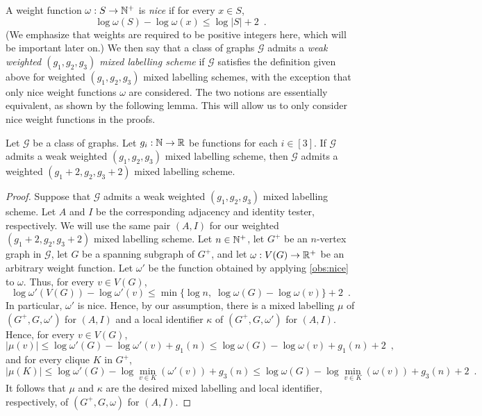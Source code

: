 \documentclass{patmorin}
\renewcommand{\le}{\leqslant}
\renewcommand{\leq}{\leqslant}
\newcommand{\david}[1]{\noindent{\color{orange} DW: #1}}
\newcommand{\vida}[1]{\noindent{\color{pink} VD: #1}}
\newcommand{\defin}[1]{\emph{\textcolor{brightmaroon}{#1}}}
\begin{document}
A weight function $\omega:S\to \mathbb{N}^+$ is \defin{nice} if
for every $x\in S$,
\[
  \log \omega(S) - \log \omega(x) \leq \log |S| + 2\enspace.
\]
(We emphasize that weights are required to be positive integers here, which will be important later on.)
We then say that a class of graphs $\mathcal{G}$ admits a \defin{weak weighted $(g_1,g_2,g_3)$ mixed labelling scheme} if $\mathcal{G}$ satisfies the definition given above for weighted $(g_1,g_2,g_3)$ mixed labelling schemes, with the exception that only nice weight functions $\omega$ are considered.
The two notions are essentially equivalent, as shown by the following lemma. This will allow us to only consider nice weight functions in the proofs.

\begin{lem}
  \label{lem:nice_weights}
  Let $\mathcal{G}$ be a class of graphs.
  Let $g_i:\mathbb{N}\to\mathbb{R}$ be functions for each $i\in[3]$.
  If $\mathcal{G}$ admits a weak weighted $(g_1,g_2,g_3)$ mixed labelling scheme, then $\mathcal{G}$ admits a weighted $(g_1+2,g_2,g_3+2)$ mixed labelling scheme.
\end{lem}
\begin{proof}
  Suppose that $\mathcal{G}$ admits a weak weighted $(g_1,g_2,g_3)$ mixed labelling scheme.
  Let $A$ and $I$ be the corresponding adjacency and identity tester, respectively.
  We will use the same pair $(A, I)$ for our weighted $(g_1+2,g_2,g_3+2)$ mixed labelling scheme.
  Let $n\in \mathbb{N}^+$, let $G^+$ be an $n$-vertex graph in $\mathcal{G}$, let $G$ be a spanning subgraph of $G^+$, and let $\omega:V(G)\to \mathbb{R}^+$ be an arbitrary weight function.
  Let $\omega'$ be the function obtained by applying \cref{obs:nice} to $\omega$.
  Thus, for every $v\in V(G)$,
  \[
    \log\omega'(V(G))-\log\omega'(v)\le\min\{\log n,\;\log\omega(G)-\log\omega(v)\}+2 \enspace.
  \]
  In particular, $\omega'$ is nice.
  Hence, by our assumption, there is a mixed labelling $\mu$ of $(G^+,G,\omega')$ for $(A,I)$ and a local identifier $\kappa$ of $(G^+,G,\omega')$ for $(A,I)$.
  Hence, for every $v\in V(G)$,
  \[
    |\mu(v)| \leq \log \omega'(G) - \log\omega'(v) + g_1(n) \leq \log \omega(G) - \log\omega(v) + g_1(n) + 2\enspace,
  \]
  and  for every clique $K$ in $G^+$,
  \[
    |\mu(K)|\le \log \omega'(G) - \log\min_{v\in K}(\omega'(v)) + g_3(n)
    \leq \log \omega(G) - \log\min_{v\in K}(\omega(v)) + g_3(n) + 2\enspace.
  \]
  It follows that $\mu$ and  $\kappa$ are the desired  mixed labelling and local identifier, respectively,  of $(G^+,G,\omega)$ for $(A,I)$.
\end{proof}
\end{document}
